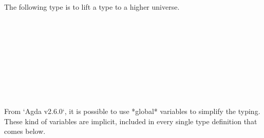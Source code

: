 \begin{code}%
\>[0]\<%
\\
\>[0][@{}l@{\AgdaIndent{0}}]%
\>[2]\AgdaSymbol{:}\AgdaSpace{}%
\AgdaSpace{}%
\AgdaSymbol{(}\AgdaSpace{}%
\AgdaSymbol{)}\<%
\\
%
\\[\AgdaEmptyExtraSkip]%
\>[0]\AgdaSpace{}%
\AgdaSymbol{=}\AgdaSpace{}%
\AgdaSpace{}%
\<%
\end{code}

The following type is to lift a type to a higher universe.

\begin{code}%
\>[0]\<%
\\
\>[0][@{}l@{\AgdaIndent{0}}]%
\>[2]%
\>[29I]\AgdaSymbol{\{}\AgdaSpace{}%
\AgdaSymbol{:}\AgdaSpace{}%
\AgdaSymbol{\}}\AgdaSpace{}%
\AgdaSpace{}%
\AgdaSymbol{(}\AgdaSpace{}%
\AgdaSymbol{:}\AgdaSpace{}%
\AgdaSpace{}%
\AgdaSymbol{)}\<%
\\
\>[.][@{}l@{}]\<[29I]%
\>[4]\AgdaSymbol{:}\AgdaSpace{}%
\AgdaSpace{}%
\AgdaSymbol{(}\AgdaSpace{}%
\AgdaSpace{}%
\AgdaSymbol{)}\<%
\\
%
\>[2]\<%
\\
%
\>[2]\AgdaSpace{}%
\<%
\\
%
\>[2]\<%
\\
\>[2][@{}l@{\AgdaIndent{0}}]%
\>[4]\AgdaSpace{}%
\AgdaSymbol{:}\AgdaSpace{}%
\<%
\\
%
\\[\AgdaEmptyExtraSkip]%
\>[0]\AgdaSpace{}%
\AgdaSpace{}%
\<%
\end{code}

From `Agda v2.6.0`, it is possible to use *global* variables
to simplify the typing. These kind of variables are implicit,
included in every single type definition that comes below.

\begin{code}%
\>[0]\<%
\\
\>[0][@{}l@{\AgdaIndent{0}}]%
\>[2]\AgdaSpace{}%
\AgdaSpace{}%
\AgdaSpace{}%
\AgdaSpace{}%
\AgdaSymbol{:}\AgdaSpace{}%
\<%
\end{code}
